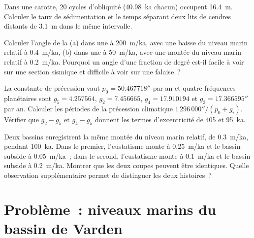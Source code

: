 \begin{exercise}[$\star\star$]\label{exo:b3:sequence-stratigraphy:9}
Dans une carotte, 20 cycles d'obliquité (\qty{40.98}{ka} chacun) occupent
\qty{16.4}{m}. Calculer le taux de sédimentation et le temps séparant deux lits de
cendres distants de \qty{3.1}{m} dans le même intervalle.
\end{exercise}

\begin{exercise}[$\star\star\star$]\label{exo:b3:sequence-stratigraphy:10}
Calculer l'angle de la  (a) dans une  à
\qty{200}{m/ka}, avec une baisse du niveau marin relatif à \qty{0.4}{m/ka}, (b) dans
une  à \qty{50}{m/ka}, avec une montée du niveau marin relatif à
\qty{0.2}{m/ka}. Pourquoi un angle d'une fraction de degré est-il facile à voir sur une
section sismique et difficile à voir sur une falaise~?
\end{exercise}

\begin{exercise}[$\star\star\star$]\label{exo:b3:sequence-stratigraphy:11}
La constante de précession vaut $p_0 = 50.467718''$ par an et quatre fréquences planétaires
sont $g_5 = 4.257564$, $g_2 = 7.456665$, $g_4 = 17.910194$ et
$g_3 = 17.366595''$ par an. Calculer les périodes de la précession climatique
$1\,296\,000''/(p_0 + g_i)$. Vérifier que $g_2 - g_5$ et $g_4 - g_5$ donnent les
termes d'excentricité de 405 et \qty{95}{ka}.
\end{exercise}

\begin{exercise}[$\star\star\star$]\label{exo:b3:sequence-stratigraphy:12}
Deux bassins enregistrent la même montée du niveau marin relatif, de \qty{0.3}{m/ka}, pendant
\qty{100}{ka}. Dans le premier, l'eustatisme monte à \qty{0.25}{m/ka} et le
bassin subside à \qty{0.05}{m/ka}~; dans le second, l'eustatisme monte à
\qty{0.1}{m/ka} et le bassin subside à \qty{0.2}{m/ka}. Montrer que les
deux coupes peuvent être identiques. Quelle observation supplémentaire permet de distinguer les
deux histoires~?
\end{exercise}

\section{Problème~: niveaux marins du bassin de Varden}

